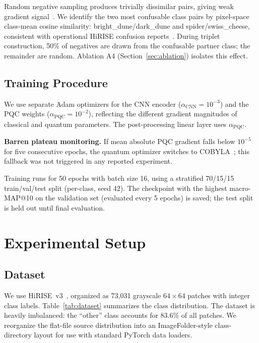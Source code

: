 \documentclass[conference,a4paper]{IEEEtran}
\begin{document}
Random negative sampling produces trivially dissimilar pairs, giving weak
gradient signal~\cite{harwood2017smartmining}.
We identify the two most confusable class pairs by pixel-space class-mean
cosine similarity: bright\_dune/dark\_dune and spider/swiss\_cheese,
consistent with operational HiRISE confusion reports~\cite{wagstaff2021mars}.
During triplet construction, 50\% of negatives are drawn from the confusable
partner class; the remainder are random.
Ablation A4 (Section~\ref{sec:ablation}) isolates this effect.

\subsection{Training Procedure}
\label{sec:training}

We use separate Adam optimizers for the CNN encoder
($\alpha_{\mathrm{CNN}} = 10^{-3}$) and the PQC weights
($\alpha_{\mathrm{PQC}} = 10^{-2}$), reflecting the different gradient
magnitudes of classical and quantum parameters.
The post-processing linear layer uses $\alpha_{\mathrm{PQC}}$.

\textbf{Barren plateau monitoring.}
If mean absolute PQC gradient falls below $10^{-5}$ for five consecutive
epochs, the quantum optimizer switches to COBYLA~\cite{powell1994direct};
this fallback was not triggered in any reported experiment.

Training runs for 50 epochs with batch size 16, using a stratified
70/15/15 train/val/test split (per-class, seed 42).
The checkpoint with the highest macro-MAP@10 on the validation set
(evaluated every 5 epochs) is saved; the test split is held out until
final evaluation.

\section{Experimental Setup}
\label{sec:experiments}

\subsection{Dataset}
\label{sec:dataset}

We use HiRISE~v3~\cite{wagstaff2018deepmars,wagstaff2021mars},
organized as 73,031 grayscale $64\times64$ patches with integer class
labels.
Table~\ref{tab:dataset} summarizes the class distribution.
The dataset is heavily imbalanced: the ``other'' class accounts for
83.6\% of all patches.
We reorganize the flat-file source distribution into an ImageFolder-style
class-directory layout for use with standard PyTorch data loaders.
\end{document}
